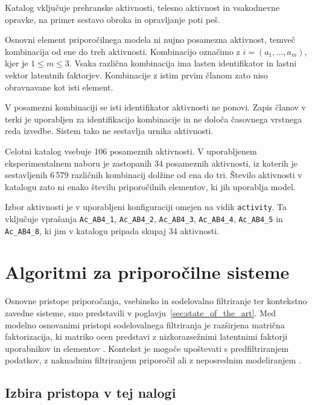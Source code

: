 \documentclass[a4paper,twoside,openright,12pt,slovene]{book}
\begin{document}
Katalog vključuje prehranske aktivnosti, telesno aktivnost in vsakodnevne opravke, na primer sestavo obroka in opravljanje poti peš.

Osnovni element priporočilnega modela ni nujno posamezna aktivnost,
temveč kombinacija od ene do treh aktivnosti. Kombinacijo označimo
z $i=(a_1,\ldots,a_m)$, kjer je $1 \leq m \leq 3$.
Vsaka različna kombinacija ima lasten identifikator in lastni vektor
latentnih faktorjev. Kombinacije z istim prvim članom zato niso
obravnavane kot isti element.

V posamezni kombinaciji se isti identifikator aktivnosti ne ponovi.
Zapis članov v terki je uporabljen za identifikacijo kombinacije
in ne določa časovnega vrstnega reda izvedbe. Sistem tako ne sestavlja
urnika aktivnosti.

Celotni katalog vsebuje 106 posameznih aktivnosti.
V uporabljenem eksperimentalnem naboru je zastopanih
34 posameznih aktivnosti, iz katerih je sestavljenih
6\,579 različnih kombinacij dolžine od ena do tri.
Število aktivnosti v katalogu zato ni enako številu
priporočilnih elementov, ki jih uporablja model.

Izbor aktivnosti je v uporabljeni konfiguraciji omejen
na vidik \texttt{activity}. Ta vključuje vprašanja
\texttt{Ac\_AB4\_1}, \texttt{Ac\_AB4\_2},
\texttt{Ac\_AB4\_3}, \texttt{Ac\_AB4\_4},
\texttt{Ac\_AB4\_5} in \texttt{Ac\_AB4\_8},
ki jim v katalogu pripada skupaj 34 aktivnosti.



\section{Algoritmi za priporočilne sisteme} 
\label{sec:recommender_algorithms}

Osnovne pristope priporočanja, vsebinsko in sodelovalno filtriranje ter
kontekstno zavedne sisteme, smo predstavili v
poglavju~\ref{sec:state_of_the_art}. Med modelno osnovanimi pristopi
sodelovalnega filtriranja je razširjena matrična faktorizacija, ki matriko
ocen predstavi z nizkorazsežnimi latentnimi faktorji uporabnikov in
elementov \cite{koren2009matrix}. Kontekst je mogoče upoštevati s
predfiltriranjem podatkov, z naknadnim filtriranjem priporočil ali
z neposrednim modeliranjem \cite{adomavicius2011context}.

\subsection{Izbira pristopa v tej nalogi}
\end{document}
